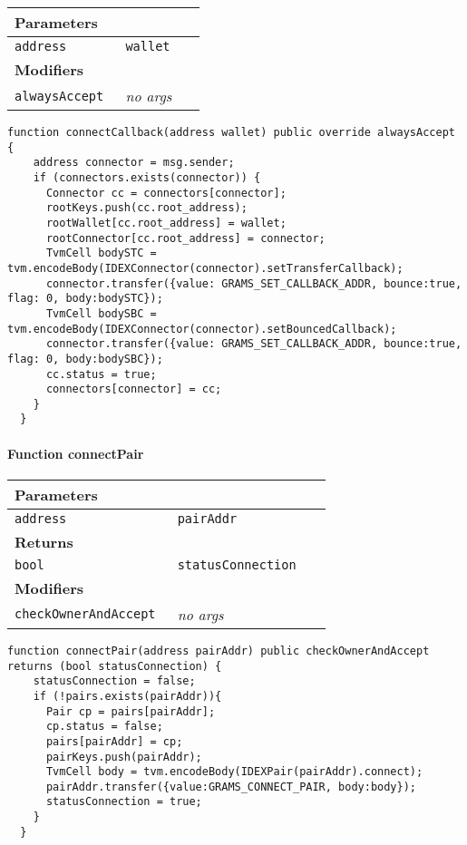 \ifsoltables
\noindent\begin{tabular}{|l|l|p{5cm}|}\hline
\multicolumn{3}{|l|}{\bf Parameters}\\\hline
\tt address & \tt wallet &\\\hline
\multicolumn{3}{|l|}{\bf Modifiers}\\\hline
\tt alwaysAccept & {\em no args} &\\\hline
\end{tabular}
\fi

\vspace{2cm}

\begin{lstlisting}[firstnumber=181]
  function connectCallback(address wallet) public override alwaysAccept {
    address connector = msg.sender;
    if (connectors.exists(connector)) {
      Connector cc = connectors[connector];
      rootKeys.push(cc.root_address);
      rootWallet[cc.root_address] = wallet;
      rootConnector[cc.root_address] = connector;
      TvmCell bodySTC = tvm.encodeBody(IDEXConnector(connector).setTransferCallback);
      connector.transfer({value: GRAMS_SET_CALLBACK_ADDR, bounce:true, flag: 0, body:bodySTC});
      TvmCell bodySBC = tvm.encodeBody(IDEXConnector(connector).setBouncedCallback);
      connector.transfer({value: GRAMS_SET_CALLBACK_ADDR, bounce:true, flag: 0, body:bodySBC});
      cc.status = true;
      connectors[connector] = cc;
    }
  }
\end{lstlisting}

\paragraph{Function connectPair}


\ifsoltables
\noindent\begin{tabular}{|l|l|p{5cm}|}\hline
\multicolumn{3}{|l|}{\bf Parameters}\\\hline
\tt address & \tt pairAddr &\\\hline
\multicolumn{3}{|l|}{\bf Returns}\\\hline
\tt bool & \tt statusConnection &\\\hline
\multicolumn{3}{|l|}{\bf Modifiers}\\\hline
\tt checkOwnerAndAccept & {\em no args} &\\\hline
\end{tabular}
\fi

\vspace{2cm}

\begin{lstlisting}[firstnumber=92]
  function connectPair(address pairAddr) public checkOwnerAndAccept  returns (bool statusConnection) {
    statusConnection = false;
    if (!pairs.exists(pairAddr)){
      Pair cp = pairs[pairAddr];
      cp.status = false;
      pairs[pairAddr] = cp;
      pairKeys.push(pairAddr);
      TvmCell body = tvm.encodeBody(IDEXPair(pairAddr).connect);
      pairAddr.transfer({value:GRAMS_CONNECT_PAIR, body:body});
      statusConnection = true;
    }
  }
\end{lstlisting}

